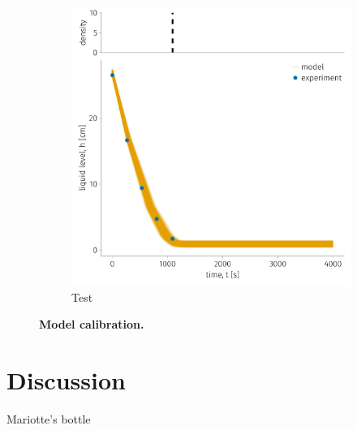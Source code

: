 \documentclass[openacc]{rsproca_new}%
\begin{document}
\begin{figure}[h!]
     \begin{subfigure}[b]{0.49\textwidth}
    	\includegraphics[width=\textwidth]{../test.pdf}
	\caption{Test} \label{fig:test}
    \end{subfigure}
    \caption{
      \textbf{Model calibration.}
      }
\end{figure}

\section{Discussion}

Mariotte's bottle \cite{kirevs2006mariotte}

\enlargethispage{20pt}




\vskip2pc



\end{document}
